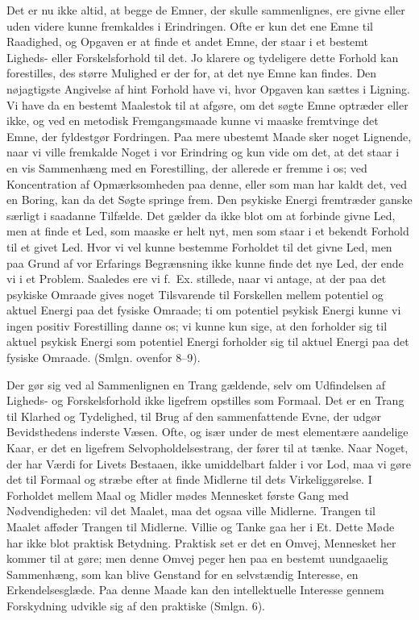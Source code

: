 \documentclass[12pt,a4paper]{book}
\newcommand{\apage}[1]{\marginnote{\footnotesize\textit{[#1]}}}
\begin{document}
Det er nu ikke altid, at begge de Emner, der skulle sammenlignes, ere
givne eller uden videre kunne fremkaldes i Erindringen. Ofte er kun det
ene Emne til Raadighed, og Opgaven er at finde et andet Emne, der staar i
et bestemt Ligheds- eller Forskelsforhold til det. Jo klarere og
tydeligere dette Forhold kan forestilles, des større Mulighed er der
for, at det nye Emne kan findes. Den nøjagtigste Angivelse af hint
Forhold have vi, hvor Opgaven kan sættes i Ligning. Vi have da en
bestemt Maalestok til at afgøre, om det søgte Emne optræder eller ikke,
og ved en metodisk Fremgangsmaade kunne vi maaske fremtvinge det Emne,
der fyldestgør Fordringen. Paa mere ubestemt Maade sker noget Lignende,
naar vi ville fremkalde Noget i vor Erindring og kun vide om det, at det
staar i en vis Sammenhæng med en Forestilling, der allerede er fremme i
os; ved Koncentration af Opmærksomheden paa denne, eller som man har
kaldt det, ved en Boring, kan da det Søgte springe frem. Den psykiske
Energi fremtræder ganske særligt i saadanne Tilfælde. Det gælder da ikke
blot om at forbinde givne Led, men at finde et Led, som maaske er helt
nyt, men som staar i et bekendt Forhold til et givet Led. Hvor vi vel
kunne bestemme Forholdet til det givne Led, men paa Grund af vor
Erfarings Begrænsning ikke kunne finde det nye Led, der ende vi i et
Problem. Saaledes ere vi f.\ Ex. stillede, naar vi antage, at der paa
det psykiske Omraade gives noget Tilsvarende til Forskellen mellem
potentiel og aktuel Energi paa det fysiske Omraade; ti om potentiel
psykisk Energi kunne vi ingen positiv Forestilling danne os; vi kunne
kun sige, at den forholder sig til aktuel psykisk Energi som potentiel
Energi forholder sig til aktuel Energi paa det fysiske Omraade. (Smlgn.
ovenfor 8--9).

Der gør sig ved al Sammenlignen en Trang gældende, selv om Udfindelsen af Ligheds- og Forskelsforhold ikke ligefrem opstilles som Formaal. Det
er en Trang til Klarhed og Tydelighed, til Brug af den sammenfattende
Evne, der \apage{67} udgør Bevidsthedens inderste Væsen. Ofte, og især under de
mest elementære aandelige Kaar, er det en ligefrem Selvopholdelsestrang,
der fører til at tænke. Naar Noget, der har Værdi for Livets Bestaaen,
ikke umiddelbart falder i vor Lod, maa vi gøre det til Formaal og stræbe
efter at finde Midlerne til dets Virkeliggørelse. I Forholdet mellem
Maal og Midler mødes Mennesket første Gang med Nødvendigheden: vil det
Maalet, maa det ogsaa ville Midlerne. Trangen til Maalet afføder Trangen
til Midlerne. Villie og Tanke gaa her i Et. Dette Møde har ikke blot
praktisk Betydning. Praktisk set er det en Omvej, Mennesket her kommer
til at gøre; men denne Omvej peger hen paa en bestemt uundgaaelig
Sammenhæng, som kan blive Genstand for en selvstændig Interesse, en
Erkendelsesglæde. Paa denne Maade kan den intellektuelle Interesse
gennem Forskydning udvikle sig af den praktiske (Smlgn. 6).
\end{document}
